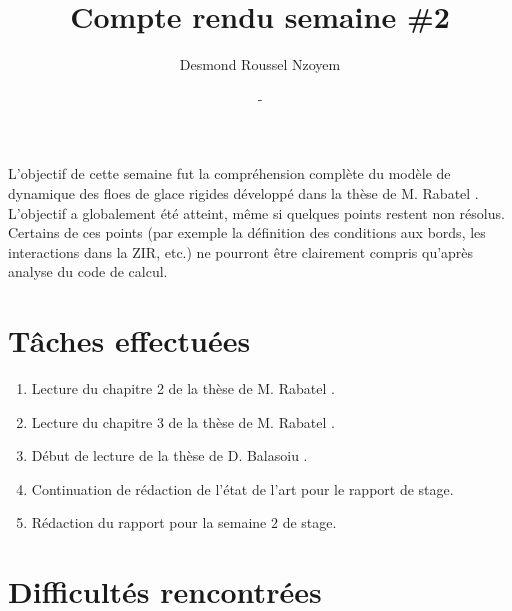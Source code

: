 \documentclass[
  french,
	11pt, %
]{fphw}
\title{Compte rendu semaine \#2} %
\author{Desmond Roussel Nzoyem} %
\date{\DTMdisplaydate{2021}{2}{10}{-1} - \DTMdisplaydate{2021}{2}{16}{-1}} %
\institute{Sorbonne Université \\ Laboratoire Jacques-Louis Lions} %
\begin{document}
\maketitle %



L'objectif de cette semaine fut la compréhension complète du modèle de dynamique des floes de glace rigides développé dans la thèse de M. Rabatel \parencite{rabatel2015thesis}. L'objectif a globalement été atteint, même si quelques points restent non résolus. Certains de ces points (par exemple la définition des conditions aux bords, les interactions dans la ZIR, etc.) ne pourront être clairement compris qu'après analyse du code de calcul.



\section{Tâches effectuées}

\begin{enumerate}
  \item Lecture du chapitre 2 de la thèse de M. Rabatel \parencite{rabatel2015thesis}.
  \item Lecture du chapitre 3 de la thèse de M. Rabatel \parencite{rabatel2015thesis}.
  \item Début de lecture de la thèse de D. Balasoiu \parencite{balasoiu2020thesis}.
  \item Continuation de rédaction de l'état de l'art pour le rapport de stage.
  \item Rédaction du rapport pour la semaine $2$ de stage.
\end{enumerate}



\section{Difficultés rencontrées}
\end{document}
